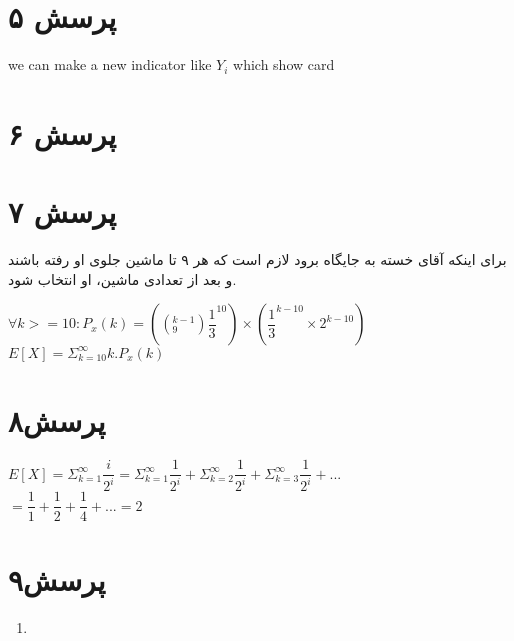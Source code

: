 \documentclass[a4paper]{article}
\begin{document}
\section*{پرسش ۵}
\begin{latin}
we can make a new indicator like $Y_i$ which show card 
\end{latin}

\pagebreak

\section*{پرسش ۶}
\pagebreak

\section*{پرسش ۷}
برای اینکه آقای خسته به جایگاه برود لازم است که هر ۹ تا ماشین جلوی او رفته باشند و بعد از تعدادی ماشین، او انتخاب شود.
\begin{latin}
$\forall k>=10: P_x(k) = ( (_9^{k-1})\dfrac{1}{3}^{10}) \times (\dfrac{1}{3}^{k-10}\times 2^{k-10})$\\
$E[X] = \Sigma^{\infty}_{k=10} k.P_x(k)$
\end{latin}
\pagebreak
\section*{پرسش۸}
\begin{latin}
$E[X] = \Sigma^{\infty}_{k=1}\dfrac{i}{2^i} = \Sigma^{\infty}_{k=1}\dfrac{1}{2^i} + \Sigma^{\infty}_{k=2}\dfrac{1}{2^i} +\Sigma^{\infty}_{k=3}\dfrac{1}{2^i} + ...$\\
$= \dfrac{1}{1} + \dfrac{1}{2} + \dfrac{1}{4} + ... = 2$
\end{latin}

\pagebreak
\section*{پرسش۹}
\begin{latin}
\begin{enumerate}
\item{}
\end{enumerate}
\end{latin}

\pagebreak
\end{document}
